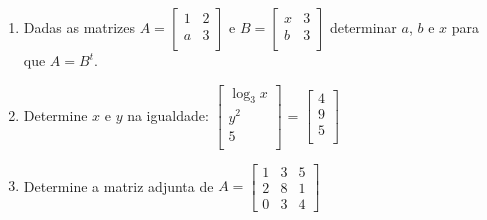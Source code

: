 \documentclass[oneside,a4paper,12pt]{article}
\begin{document}
\begin{enumerate}
	\item Dadas as matrizes 
	$
	A=\left[
	\begin{array}{cc}
	1	&	2	\\
	a	&	3	\\
	\end{array}
	\right]$
	e
	$
	B=\left[
	\begin{array}{cc}
	x	&	3	\\
	b	&	3	\\
	\end{array}
	\right]$
	determinar $a$, $b$ e $x$ para que $A = B^t$.
	
	\item Determine $x$ e $y$ na igualdade:
	$ \left[
	\begin{array}{c}
	\log_{3}x	\\
	y^2	\\
	5	\\
	\end{array}
	\right]$
	=
	$ \left[
	\begin{array}{c}
	4	\\
	9	\\
	5	\\
	\end{array}
	\right]$
	
	\item Determine a matriz adjunta de
	$ A = \left[
	\begin{array}{ccc}
	1	&	3	&	5	\\
	2	&	8	&	1	\\
	0	&	3	&	4
	\end{array}
	\right]$
	
	
	
\end{enumerate}

	
\end{document}
